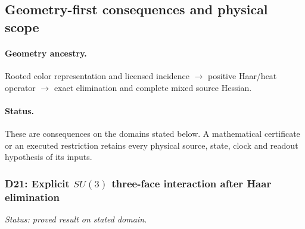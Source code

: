 \documentclass[12pt,a4paper]{article}
\begin{document}

\subsection{Geometry-first consequences and physical scope}
\label{p10:sec:v2201-geometry-first-consequences}
\paragraph{Geometry ancestry.}
Rooted color representation and licensed incidence $\to$ positive Haar/heat operator $\to$ exact elimination and complete mixed source Hessian.
\paragraph{Status.}
These are consequences on the domains stated below.
A mathematical certificate or an executed restriction retains every
physical source, state, clock and readout hypothesis of its inputs.


\subsubsection{D21: Explicit $SU(3)$ three-face interaction after Haar elimination}
\label{p10:sec:v2201-derived-d21}
\noindent\textit{Status: proved result on stated domain.}
\end{document}

